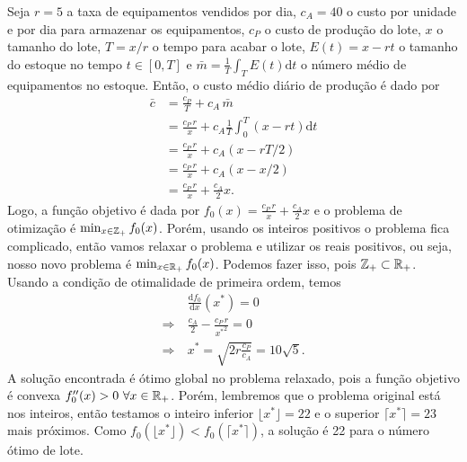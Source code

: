 \begin{questions}
\begin{solution}
	Seja $r = 5$ a taxa de equipamentos vendidos por dia, $c_A = 40$ o custo por unidade e por dia para armazenar os equipamentos, $c_P$ o custo de produção do lote, $x$ o tamanho do lote, $T = x/r$ o tempo para acabar o lote, $E(t) = x-rt$ o tamanho do estoque no tempo $t\in[0,T]$ e $\bar m = \frac{1}{T}\int_T E(t)\mathrm{d}t$ o número médio de equipamentos no estoque. Então, o custo médio diário de produção é dado por
    \begin{align*}
    	\bar c 	&= \frac{c_P}{T} + c_A\,\bar m \\
        		&= \frac{c_P\,r}{x} + c_A \frac{1}{T}\int_0^T(x-rt)\mathrm{d}t \\
                &= \frac{c_P\,r}{x} + c_A (x-rT/2) \\
                &= \frac{c_P\,r}{x} + c_A (x-x/2) \\
                &= \frac{c_P\,r}{x} + \frac{c_A}{2}x.
    \end{align*}
    Logo, a função objetivo é dada por $f_0(x) = \frac{c_P\,r}{x} + \frac{c_A}{2}x$ e o problema de otimização é $\min_{x\in{\mathbb Z}_+} f_0(x)$. Porém, usando os inteiros positivos o problema fica complicado, então vamos relaxar o problema e utilizar os reais positivos, ou seja, nosso novo problema é $\min_{x\in{\mathbb R}_+} f_0(x)$. Podemos fazer isso, pois ${\mathbb Z}_+ \subset {\mathbb R}_+$. Usando a condição de otimalidade de primeira ordem, temos
    \begin{align*}
    		&\frac{\mathrm{d}f_0}{\mathrm{d}x}(x^*) = 0 \\
        \Rightarrow~ &\frac{c_A}{2} - \frac{c_P\,r}{{x^*}^2} = 0 \\
        \Rightarrow~ &\boxed{x^* = \sqrt{2r\frac{c_P}{c_A}} = 10\sqrt{5}}.
    \end{align*}
    A solução encontrada é ótimo global no problema relaxado, pois a função objetivo é convexa ${f_0''(x) > 0}~{\forall x\in{\mathbb R}_+}$. Porém, lembremos que o problema original está nos inteiros, então testamos o inteiro inferior $\lfloor x^*\rfloor = 22$ e o superior $\lceil x^*\rceil = 23$ mais próximos. Como $f_0(\lfloor x^*\rfloor)<f_0(\lceil x^*\rceil)$, a solução é 22 para o número ótimo de lote.
\end{solution}

\end{questions}

